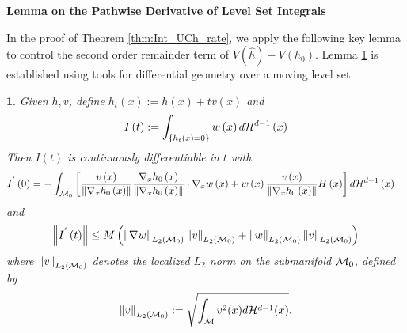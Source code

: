 \documentclass[12pt,american]{article}
\theoremstyle{definition}
\theoremstyle{plain}
\theoremstyle{definition}
\theoremstyle{plain}
\newtheorem{lem}{\protect\lemmaname}
\theoremstyle{plain}
\theoremstyle{plain}
\theoremstyle{plain}
\theoremstyle{plain}
\newcommand{\dHd}{d\mathcal{H}^{d-1}}
\newcommand{\norm}[1]{\left\| #1 \right\|}
\providecommand{\lemmaname}{Lemma}
\providecommand{\lemmaname}{Lemma}
\begin{document}
\noindent \textbf{Lemma on the Pathwise Derivative of Level Set Integrals}

In the proof of Theorem \ref{thm:Int_UCh_rate}, we apply the following key lemma to control the second order remainder term of $V(\hat{h})-V(h_0)$. Lemma \ref{lem:PathD_Level} is established using tools for differential geometry over a moving level set.

\begin{lem}\label{lem:PathD_Level}Given $h,v$, define $h_{t}\left(x\right):=h\left(x\right)+tv\left(x\right)$
and
\begin{equation}
I\left(t\right):=\int_{\left\{ h_{t}\left(x\right)=0\right\} }w\left(x\right)d{\cal H}^{d-1}\left(x\right)\label{eq:It_exact}
\end{equation}
Then $I\left(t\right)$ is continuously differentiable in $t$ with
\begin{align}
I^{'}\left(0\right)
&=-\int_{{\cal M}_{0}}\left[
\frac{v\left(x\right)}{\norm{\Dif_{x}h_{0}\left(x\right)}}
\frac{\Dif_{x}h_{0}\left(x\right)}{\norm{\Dif_{x}h_{0}\left(x\right)}}\cd\Dif_{x}w\left(x\right)
+w\left(x\right)\frac{v\left(x\right)}{\norm{\Dif_{x}h_{0}\left(x\right)}}
H\left(x\right)\right]d{\cal H}^{d-1}\left(x\right)
\label{eq:I0}
\end{align}
and
\begin{equation}
\norm{I^{'}\left(t\right)}\leq M\left(\norm{\Dif w}_{L_2(\cM_0)}\norm v_{L_2(\cM_0)}+\norm w_{L_2(\cM_0)}\norm v_{L_2(\cM_0)}\right)\label{eq:bound_I't}
\end{equation}
where $\norm{v}_{L_2(\cM_0)}$ denotes the localized $L_2$ norm on the submanifold $\mathcal{M}_0$, defined by
\begin{equation}\label{eq:L2M}
\norm{v}_{L_2(\cM_0)} := \sqrt{\int_\cM v^2(x)\dHd(x)}.
\end{equation}
\end{lem}
\end{document}
